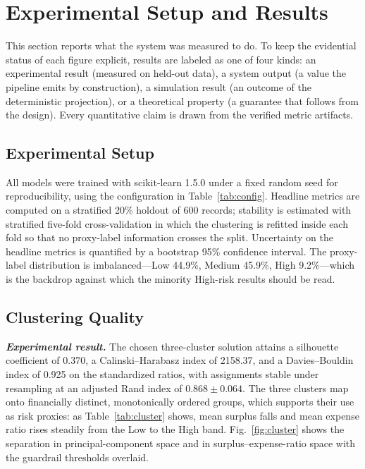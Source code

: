 \section{Experimental Setup and Results}\label{sec:results}

This section reports what the system was measured to do. To keep the evidential status of
each figure explicit, results are labeled as one of four kinds: an experimental result
(measured on held-out data), a system output (a value the pipeline emits by
construction), a simulation result (an outcome of the deterministic projection), or a
theoretical property (a guarantee that follows from the design). Every quantitative claim
is drawn from the verified metric artifacts.

\subsection{Experimental Setup}\label{subsec:setup}
All models were trained with scikit-learn 1.5.0 under a fixed random seed for
reproducibility, using the configuration in Table~\ref{tab:config}. Headline metrics are
computed on a stratified 20\% holdout of 600 records; stability is estimated with
stratified five-fold cross-validation in which the clustering is refitted inside each
fold so that no proxy-label information crosses the split. Uncertainty on the headline
metrics is quantified by a bootstrap 95\% confidence interval. The proxy-label
distribution is imbalanced---Low 44.9\%, Medium 45.9\%, High 9.2\%---which is the
backdrop against which the minority High-risk results should be read.

\subsection{Clustering Quality}\label{subsec:clustering-quality}
\textbf{\textit{Experimental result.}} The chosen three-cluster solution attains a
silhouette coefficient of 0.370, a Calinski--Harabasz index of 2158.37, and a
Davies--Bouldin index of 0.925 on the standardized ratios, with assignments stable under
resampling at an adjusted Rand index of $0.868 \pm 0.064$. The three clusters map onto
financially distinct, monotonically ordered groups, which supports their use as risk
proxies: as Table~\ref{tab:cluster} shows, mean surplus falls and mean expense ratio
rises steadily from the Low to the High band. Fig.~\ref{fig:cluster} shows the separation
in principal-component space and in surplus--expense-ratio space with the guardrail
thresholds overlaid.

